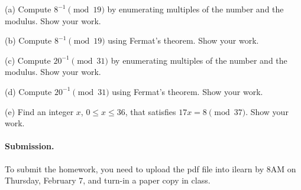 \documentclass{article}
\begin{document}

\begin{problem}
(a) Compute $8^{-1}\pmod{19}$ by enumerating multiples of the number and the modulus.
Show your work.

\smallskip\noindent
(b) Compute $8^{-1}\pmod{19}$ using Fermat's theorem. Show your work.

\smallskip\noindent
(c) Compute $20^{-1}\pmod{31}$ by enumerating multiples of the number and the modulus.
Show your work.

\smallskip\noindent
(d) Compute $20^{-1}\pmod{31}$ using Fermat's theorem. Show your work.

\smallskip\noindent
(e) Find an integer $x$, $0\le x \le 36$, that satisfies
$17x = 8 \pmod{37}$. Show your work.
\end{problem}



\vskip 0.1in
\paragraph{Submission.}
To submit the homework, you need to upload the pdf file into ilearn by 8AM on Thursday, February 7,
and turn-in a paper copy in class.



\vfill
\end{document}
